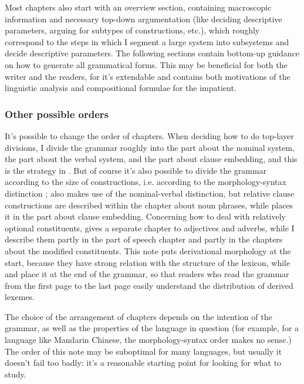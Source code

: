 \documentclass[UTF8, a4paper, oneside, scheme=plain]{ctexrep}
\begin{document}
Most chapters also start with an overview section,
containing macroscopic information and necessary top-down argumentation
(like deciding descriptive parameters,
arguing for subtypes of constructions, etc.),
which roughly correspond to the 
steps in which I segment a large system into subsystems 
and decide descriptive parameters.
The following sections contain bottom-up guidance 
on how to generate all grammatical forms.
This may be beneficial for both the writer and the readers,
for it's extendable
and contains both motivations of the linguistic analysis 
and compositional formulae for the impatient.

\subsubsection{Other possible orders}

It's possible to change the order of chapters.
When deciding how to do top-layer divisions,
I divide the grammar roughly into 
the part about the nominal system, 
the part about the verbal system,
and the part about clause embedding,
and this is the strategy in \citet{jacques2021grammar}.
But of course it's also possible to 
divide the grammar according to the size of constructions, 
i.e. according to the morphology-syntax distinction
\citep{greenough2013allen,forker2020grammar};
\citet{maurer2021grammar} also makes use of the nominal-verbal distinction,
but relative clause constructions are described within the chapter about noun phrases,
while \citet{jacques2021grammar} places it in the part about clause embedding.
Concerning how to deal with relatively optional constituents,
\citet{cgel} gives a separate chapter to adjectives and adverbs,
while I describe them partly in the part of speech chapter 
and partly in the chapters about the modified constituents.
This note puts derivational morphology at the start,
because they have strong relation with the structure of the lexicon,
while \citet{cgel} and \citet{maurer2021grammar} place it at the end of the grammar,
so that readers who read the grammar from the first page to the last page 
easily understand the distribution of derived lexemes.

The choice of the arrangement of chapters depends on the intention of the grammar,
as well as the properties of the language in question 
(for example, for a language like Mandarin Chinese, 
the morphology-syntax order makes no sense.)
The order of this note may be suboptimal for many languages,
but usually it doesn't fail too badly:
it's a reasonable starting point for looking for what to study.
\end{document}
